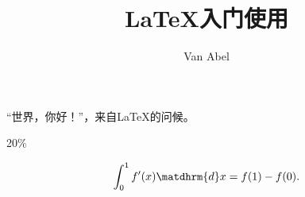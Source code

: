 \documentclass{amsart}
\title[\LaTeX]{\LaTeX 入门使用}
\author{Van Abel}
\date{}
\begin{document}
\maketitle

“世界，你好！”，来自\LaTeX 的问候。

20\%

$$
\int_0^1 f'(x) \matdhrm{d}x=f(1)-f(0).
$$
\end{document}
